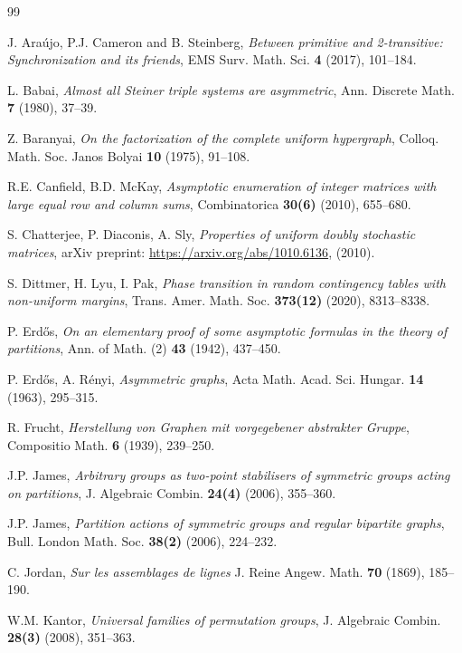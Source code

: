 \documentclass{daj}
\theoremstyle{plain}
\theoremstyle{definition}
\begin{document}
\begin{thebibliography}{99}

J. Ara\'ujo, P.J. Cameron and B. Steinberg,
\emph{Between primitive and 2-transitive: Synchronization and its friends}, EMS Surv.
Math. Sci. \textbf{4} (2017), 101--184.

L. Babai, \emph{Almost all Steiner triple systems are asymmetric}, Ann. Discrete Math. \textbf{7} (1980), 37--39.

Z. Baranyai, \emph{On the factorization of the complete uniform hypergraph}, Colloq. Math. Soc. Janos Bolyai \textbf{10} (1975), 91--108.

R.E. Canfield, B.D. McKay, \emph{Asymptotic enumeration of integer matrices with large equal row and column sums}, Combinatorica \textbf{30(6)} (2010), 655--680.

S. Chatterjee, P. Diaconis, A. Sly, \emph{Properties of uniform doubly stochastic matrices}, arXiv preprint: \url{https://arxiv.org/abs/1010.6136}, (2010).

S. Dittmer, H. Lyu, I. Pak, \emph{Phase transition in random contingency tables with non-uniform margins}, Trans. Amer. Math. Soc. \textbf{373(12)} (2020), 8313--8338.

P. Erd\H{o}s, \emph{On an elementary proof of some asymptotic formulas in the theory of partitions}, Ann. of Math. (2) \textbf{43} (1942), 437--450.

P. Erd\H{o}s, A. R\'{e}nyi, \emph{Asymmetric graphs}, Acta Math. Acad. Sci. Hungar. \textbf{14} (1963), 295--315.

R. Frucht, \emph{Herstellung von {G}raphen mit vorgegebener abstrakter {G}ruppe}, Compositio Math. \textbf{6} (1939), 239--250.

J.P. James, \emph{Arbitrary groups as two-point stabilisers of symmetric groups acting on partitions}, J. Algebraic Combin. \textbf{24(4)} (2006), 355--360.

J.P. James, \emph{Partition actions of symmetric groups and regular bipartite graphs}, Bull. London Math. Soc. \textbf{38(2)} (2006), 224--232.

C. Jordan, \emph{Sur les assemblages de lignes} J. Reine Angew. Math. \textbf{70} (1869), 185--190.

W.M. Kantor, \emph{Universal families of permutation groups}, J. Algebraic Combin. \textbf{28(3)} (2008), 351--363.


\end{thebibliography}
\end{document}
